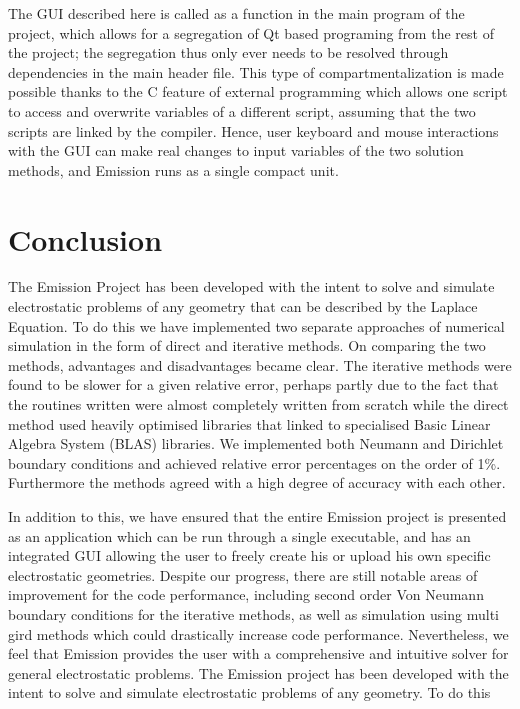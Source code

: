 \documentclass[a4paper]{article}
\begin{document}
\linebreak
\linebreak
\noindent
The GUI described here is called as a function in the main program of the project, which allows for a segregation of Qt based programing from the rest of the project; the segregation thus only ever needs to be resolved through dependencies in the main header file. This type of compartmentalization is made possible thanks to the C feature of external programming which allows one script to access and overwrite variables of a different script, assuming that the two scripts are linked by the compiler. Hence, user keyboard and mouse interactions with the GUI can make real changes to input variables of the two solution methods, and Emission runs as a single compact unit. 




\section*{Conclusion}
The Emission Project has been developed with the intent to solve and simulate electrostatic problems of any geometry that can be described by the Laplace Equation.
To do this we have implemented two separate approaches of numerical simulation in the form of direct and iterative methods. On comparing the two methods, advantages
and disadvantages became clear. The iterative methods were found to be slower for a given relative error, perhaps partly due to the fact that the routines written
were almost completely written from scratch while the direct method used heavily optimised libraries that linked to specialised Basic Linear Algebra System (BLAS)
libraries. We implemented both Neumann and Dirichlet boundary conditions and achieved relative error percentages on the order of 1\%. Furthermore the methods agreed
with a high degree of accuracy with each other.

In addition to this, we have ensured that the entire Emission project is presented as an application which can be run through a single executable, and has an integrated GUI allowing the user to freely create his or upload his own specific electrostatic geometries. Despite our progress, there are still notable areas of improvement for the code performance, including second order Von Neumann boundary conditions for the iterative methods, as well as simulation using multi gird methods which could drastically increase code performance. Nevertheless, we feel that Emission provides the user with a comprehensive and intuitive solver for general electrostatic problems.
The Emission project has been developed with the intent to solve and simulate electrostatic problems of any geometry. To do this
\end{document}
